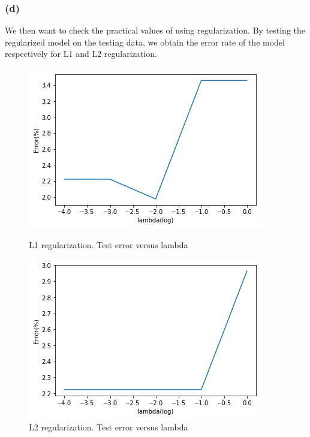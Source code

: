 \documentclass{article}
\begin{document}
\subsubsection*{(d)}
We then want to check the practical values of using regularization. By testing the regularized model on the testing data, we obtain the error rate of the model respectively for L1 and L2 regularization.
\begin{figure}[h]
	\begin{minipage}{0.48\textwidth}
		\centering
	\includegraphics[width=\textwidth]{pics/lambda_test_1.png}
	\caption{L1 regularization. Test error versus lambda}
	\end{minipage}\hfill
	\begin {minipage}{0.48\textwidth}
	\centering
	\includegraphics[width=\textwidth]{pics/lambda_test_2.png}
	\caption{L2 regularization. Test error versus lambda}
\end{minipage}
\end{figure}
\end{document}
